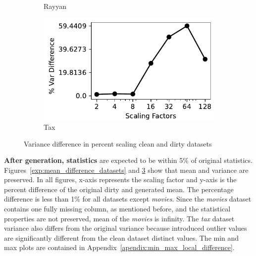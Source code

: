 \begin{figure}[!t]
\begin{subfigure}{0.32\textwidth}
    \caption{Rayyan}
    \label{exp:var_rayyan}
\end{subfigure}
\hfill
\begin{subfigure}{0.32\textwidth}
    \includegraphics[width=\textwidth]{figures/plot/var/variance_diff_tax.pdf}
    \caption{Tax}
    \label{exp:var_tax}
\end{subfigure}
\hfill
\caption{Variance difference in percent scaling clean and dirty datasets}
\label{exp:var_difference_datasets}
\end{figure}


\textbf{After generation, statistics} are expected to be within 5\% of original statistics.
Figures~\ref{exp:mean_difference_datasets} and \ref{exp:var_difference_datasets} show that mean and variance are preserved.
In all figures, x-axis represents the scaling factor and y-axis is the percent difference of the original dirty and generated mean.
The percentage difference is less than 1\% for all datasets except \textit{movies}.
Since the \textit{movies} dataset contains one fully missing column, as mentioned before, and the statistical properties are not preserved, mean of the \textit{movies} is infinity. 
The \textit{tax} dataset variance also differs from the original variance because introduced outlier values are significantly different from the clean dataset distinct values.
The min and max plots are contained in Appendix~\ref{apendix:min_max_local_difference}.
